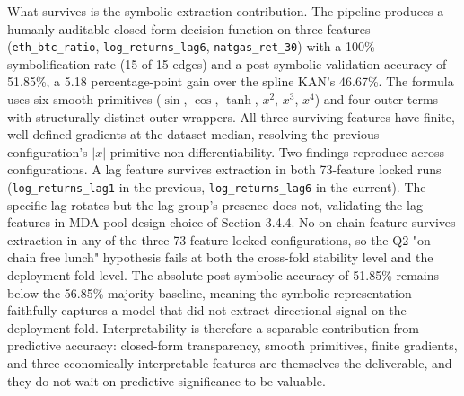 \documentclass[12pt,a4paper,oneside]{article}
\begin{document}
What survives is the symbolic-extraction contribution. The pipeline produces a humanly auditable closed-form decision function on three features (\texttt{eth\_btc\_ratio}, \texttt{log\_returns\_lag6}, \texttt{natgas\_ret\_30}) with a 100\% symbolification rate (15 of 15 edges) and a post-symbolic validation accuracy of 51.85\%, a 5.18 percentage-point gain over the spline KAN's 46.67\%. The formula uses six smooth primitives ($\sin$, $\cos$, $\tanh$, $x^2$, $x^3$, $x^4$) and four outer terms with structurally distinct outer wrappers. All three surviving features have finite, well-defined gradients at the dataset median, resolving the previous configuration's $\lvert x \rvert$-primitive non-differentiability. Two findings reproduce across configurations. A lag feature survives extraction in both 73-feature locked runs (\texttt{log\_returns\_lag1} in the previous, \texttt{log\_returns\_lag6} in the current). The specific lag rotates but the lag group's presence does not, validating the lag-features-in-MDA-pool design choice of Section 3.4.4. No on-chain feature survives extraction in any of the three 73-feature locked configurations, so the Q2 "on-chain free lunch" hypothesis fails at both the cross-fold stability level and the deployment-fold level. The absolute post-symbolic accuracy of 51.85\% remains below the 56.85\% majority baseline, meaning the symbolic representation faithfully captures a model that did not extract directional signal on the deployment fold. Interpretability is therefore a separable contribution from predictive accuracy: closed-form transparency, smooth primitives, finite gradients, and three economically interpretable features are themselves the deliverable, and they do not wait on predictive significance to be valuable.
\end{document}
